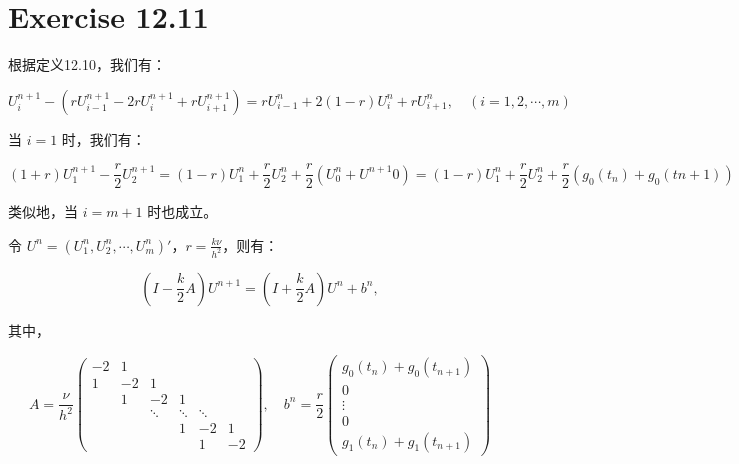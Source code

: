 \documentclass[twoside,a4paper]{article}
\begin{document}
\pagestyle{fancy}
\fancyhead{}

\section{Exercise 12.11}
根据定义12.10，我们有：

$$U_i^{n+1}-(rU_{i-1}^{n+1} - 2rU_i^{n+1} + rU_{i+1}^{n+1}) = rU_{i-1}^n + 2(1-r)U_i^n + rU_{i+1}^n, \quad (i = 1,2,\cdots,m)$$

当 $i=1$ 时，我们有：

$$(1+r)U^{n+1}_1 - \frac{r}{2}U^{n+1}_2 = (1-r)U^n_1+\frac{r}{2}U^n_2+\frac{r}{2}(U_0^n+U^{n+1}0) = (1-r)U^n_1+\frac{r}{2}U^n_2+\frac{r}{2}(g_0(t_n)+g_0(t{n+1}))$$

类似地，当 $i=m+1$ 时也成立。

令 $U^n = (U_1^n, U_2^n,\cdots, U_m^n)'$，$r=\frac{k\nu}{h^2}$，则有：

$$(I - \frac{k}{2}A)U^{n+1} = (I+\frac{k}{2}A)U^n+b^n,$$

其中，

$$A = \frac{\nu}{h^2}\begin{pmatrix}
-2 & 1 & & & & \\
1 & -2 & 1 & & & \\
& 1 & -2 & 1 & & \\
& & \ddots & \ddots & \ddots & \\
& & & 1 & -2 & 1\\
& & & & 1 & -2
\end{pmatrix}, 
\quad 
b^n = \frac{r}{2} \begin{pmatrix}
g_0(t_n)+g_0(t_{n+1})\\
0\\
\vdots\\
0\\
g_1(t_n)+ g_1(t_{n+1})
\end{pmatrix}$$
\end{document}
